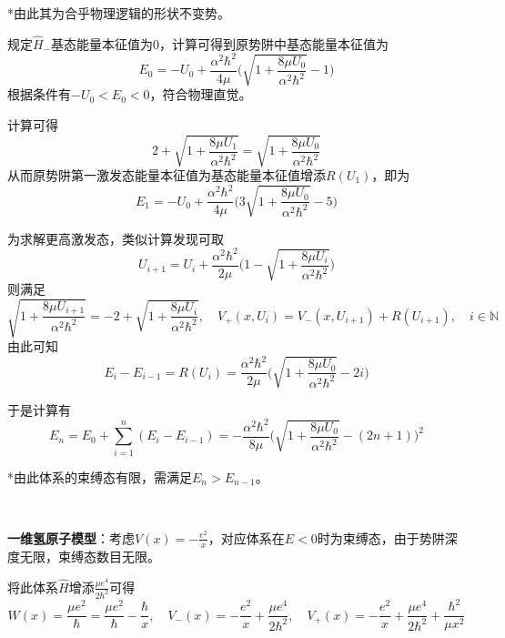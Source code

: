 \documentclass[a4paper,UTF8,fontset=windows]{ctexart}
\begin{document}
*由此其为合乎物理逻辑的形状不变势。

规定$\hat{H}_-$基态能量本征值为0，计算可得到原势阱中基态能量本征值为
$$E_0=-U_0+\frac{\alpha^2\hbar^2}{4\mu}\bigg(\sqrt{1+\frac{8\mu U_0}{\alpha^2\hbar^2}}-1\bigg)$$
根据条件有$-U_0<E_0<0$，符合物理直觉。

计算可得
$$2+\sqrt{1+\frac{8\mu U_1}{\alpha^2\hbar^2}}=\sqrt{1+\frac{8\mu U_0}{\alpha^2\hbar^2}}$$
从而原势阱第一激发态能量本征值为基态能量本征值增添$R(U_1)$，即为
$$E_1=-U_0+\frac{\alpha^2\hbar^2}{4\mu}\bigg(3\sqrt{1+\frac{8\mu U_0}{\alpha^2\hbar^2}}-5\bigg)$$

为求解更高激发态，类似计算发现可取
$$U_{i+1}=U_i+\frac{\alpha^2\hbar^2}{2\mu}\bigg(1-\sqrt{1+\frac{8\mu U_i}{\alpha^2\hbar^2}}\bigg)$$
则满足
$$\sqrt{1+\frac{8\mu U_{i+1}}{\alpha^2\hbar^2}}=-2+\sqrt{1+\frac{8\mu U_i}{\alpha^2\hbar^2}},\quad V_+(x,U_i)=V_-(x,U_{i+1})+R(U_{i+1}),\quad i\in\mathbb{N}$$
由此可知
$$E_i-E_{i-1}=R(U_i)=\frac{\alpha^2\hbar^2}{2\mu}\bigg(\sqrt{1+\frac{8\mu U_0}{\alpha^2\hbar^2}}-2i\bigg)$$

于是计算有
$$E_n=E_0+\sum_{i=1}^n(E_i-E_{i-1})=-\frac{\alpha^2\hbar^2}{8\mu}\bigg(\sqrt{1+\frac{8\mu U_0}{\alpha^2\hbar^2}}-(2n+1)\bigg)^2$$

*由此体系的束缚态有限，需满足$E_n>E_{n-1}$。

\

\textbf{一维氢原子模型}：考虑$V(x)=-\frac{e^2}{x}$，对应体系在$E<0$时为束缚态，由于势阱深度无限，束缚态数目无限。

将此体系$\hat{H}$增添$\frac{\mu e^4}{2\hbar^2}$可得
$$W(x)=\frac{\mu e^2}{\hbar}=\frac{\mu e^2}{\hbar}-\frac{\hbar}{x},\quad V_-(x)=-\frac{e^2}{x}+\frac{\mu e^4}{2\hbar^2},\quad V_+(x)=-\frac{e^2}{x}+\frac{\mu e^4}{2\hbar^2}+\frac{\hbar^2}{\mu x^2}$$

*由于$\hat{H}_-$基态能量为0，一维氢原子最低能量本征值即为$-\frac{\mu e^4}{2\hbar^2}$，符合玻尔能级公式。

由于$V_\pm$形式并不构成形状不变势，需要修正，定义
$$U_-(x,n)=-\frac{e^2}{x}+\frac{\mu e^4}{2\hbar^2(n+1)^2}+\frac{\hbar^2n(n+1)}{2\mu x^2},\quad U_+(x,n)=-\frac{e^2}{x}+\frac{\mu e^4}{2\hbar^2(n+1)^2}+\frac{\hbar^2(n+1)(n+2)}{2\mu x^2}$$
$$R(n)=\frac{\mu e^4}{2\hbar^2}\bigg(\frac{1}{n^2}-\frac{1}{(n+1)^2}\bigg)$$

*这时$W(x,n)=\frac{\mu e^2}{(n+1)\hbar}-\frac{(n+1)\hbar}{x}$，可验证上方定义能形成符合物理诠释的形状不变势。

*由于$U_-(x,0)=V_-(x)$，这样修正后仍可正确计算出各激发态的能量本征值，对原问题即
$$E_{n+1}-E_n=R(n),\quad E_n=E_0+\sum_{i=1}^n(E_i-E_{i-1})=-\frac{\mu e^4}{2n^2\hbar^2}$$
符合玻尔能级公式。
\end{document}
